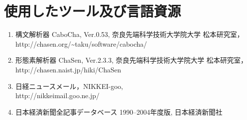 \documentclass[japanese]{jnlp_1.4}
\begin{document}
\section*{使用したツール及び言語資源}
\begin{enumerate}
\def\newblock{}
\item\label{ツール:cabocha} 構文解析器 {CaboCha},  {Ver}.0.53,
     \newblock 奈良先端科学技術大学院大学 松本研究室，\\
     \newblock http://chasen.org/\~{}taku/software/cabocha/
\item\label{ツール:chasen} 形態素解析器 {ChaSen},  {Ver}.2.3.3,
     \newblock 奈良先端科学技術大学院大学 松本研究室，\\
     \newblock http://chasen.naist.jp/hiki/ChaSen
\item\label{言語資源:nikkei-goo} 日経ニュースメール，NIKKEI-goo, \\
     \newblock http://nikkeimail.goo.ne.jp/
\item\label{言語資源:日経}日本経済新聞全記事データベース
     1990--2004年度版,
     \newblock 日本経済新聞社
\end{enumerate}
\end{document}
